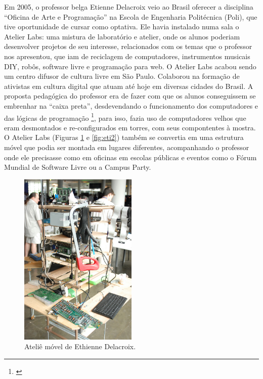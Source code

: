 Em 2005, o professor belga Etienne Delacroix veio ao Brasil oferecer a disciplina ``Oficina de Arte e Programação'' na Escola de Engenharia Politécnica (Poli), que tive oportunidade de cursar como optativa. Ele havia instalado numa sala o Atelier Labs: uma mistura de laboratório e atelier, onde os alunos poderiam desenvolver projetos de seu interesse, relacionados com os temas que o professor nos apresentou, que iam de reciclagem de computadores, instrumentos musicais DIY, robôs, software livre e programação para web. O Atelier Labs acabou sendo um  centro difusor de cultura livre em São Paulo. Colaborou na formação de ativistas em cultura digital que atuam até hoje em diversas cidades do Brasil. A proposta pedagógica do professor era de fazer com que os alunos conseguissem se embrenhar na ``caixa preta'', desdevendando o funcionamento dos computadores e das lógicas de programação \footnote{\cite{Delacroix2009}}, para isso, fazia uso de computadores velhos que eram desmontados e re-configurados em torres, com seus compontentes à mostra. O Atelier Labs (Figuras \ref{fig:eti} e \ref{fig:eti2}) também se convertia em uma estrutura móvel que podia ser montada em lugares diferentes, acompanhando o professor onde ele precisasse como em oficinas em escolas públicas e eventos como o Fórum Mundial de Software Livre ou a Campus Party.

\begin{figure}

\includegraphics[width=0.5\textwidth]{pictures/cap1/eti1}
\caption{Ateliê móvel de Ethienne Delacroix.}
\label{fig:eti}
\end{figure}

